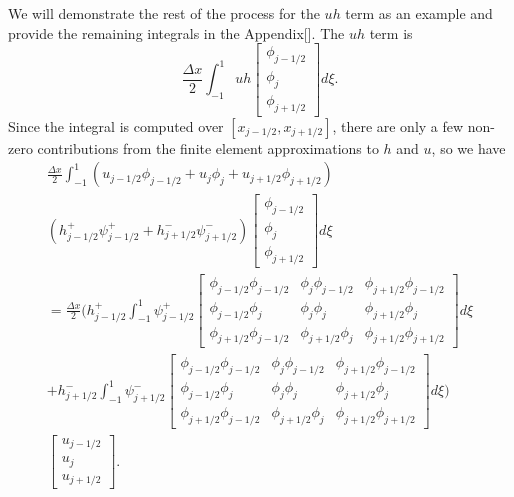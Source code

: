 We will demonstrate the rest of the process for the $uh$ term as an example and provide the remaining integrals in the Appendix[]. The $uh$ term is 
\begin{equation*}
\frac{\Delta x}{2}\int_{-1 }^{1}  uh \begin{bmatrix}
\phi_{j-1/2}\\\phi_j \\\phi_{j+1/2}
\end{bmatrix} d\xi.
\end{equation*}
Since the integral is computed over $\left[x_{j-1/2},x_{j+1/2}\right]$, there are only a few non-zero contributions from the finite element approximations to $h$ and $u$, so we have
\begin{multline*}
\frac{\Delta x}{2}\int_{-1 }^{1}  \left(u_{j-1/2}\phi_{j-1/2} + u_{j}\phi_{j} + u_{j+1/2}\phi_{j+1/2}\right) \\\left(h^+_{j-1/2}\psi^+_{j-1/2}  + h^-_{j+1/2}\psi^-_{j+1/2}\right) \begin{bmatrix}
\phi_{j-1/2}\\\phi_j \\\phi_{j+1/2}
\end{bmatrix} d\xi\\
=\frac{\Delta x}{2}\Bigg( h^+_{j-1/2} \int_{-1 }^{1} \psi^+_{j-1/2}  \begin{bmatrix}
\phi_{j-1/2} \phi_{j-1/2} & \phi_{j}  \phi_{j-1/2}  & \phi_{j+1/2} \phi_{j-1/2}\\\phi_{j-1/2} \phi_{j} & \phi_{j} \phi_{j} &  \phi_{j + 1/2} \phi_{j}\\\phi_{j+1/2} \phi_{j-1/2} &  \phi_{j+1/2} \phi_{j} & \phi_{j+1/2} \phi_{j+1/2}
\end{bmatrix} d\xi  \\ +  h^-_{j+1/2}\int_{-1 }^{1} \psi^-_{j+1/2} \begin{bmatrix}
\phi_{j-1/2} \phi_{j-1/2} & \phi_{j}  \phi_{j-1/2}  & \phi_{j+1/2} \phi_{j-1/2}\\\phi_{j-1/2} \phi_{j} & \phi_{j} \phi_{j} &  \phi_{j + 1/2} \phi_{j}\\\phi_{j+1/2} \phi_{j-1/2} &  \phi_{j+1/2} \phi_{j} & \phi_{j+1/2} \phi_{j+1/2}
\end{bmatrix} d\xi \Bigg) \\  \begin{bmatrix}
u_{j-1/2}\\u_j \\u _{j+1/2}
\end{bmatrix}.
\end{multline*}

